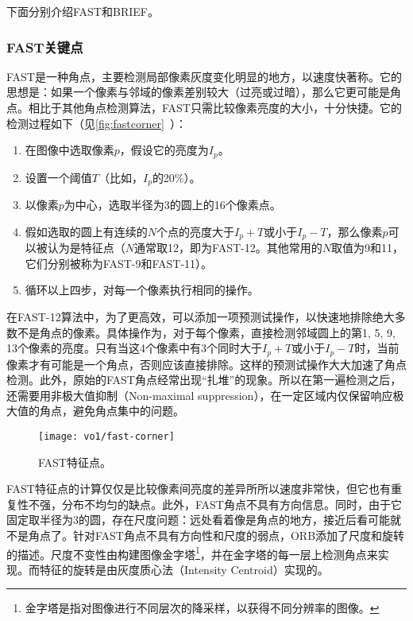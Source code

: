 下面分别介绍FAST和BRIEF。
\subsubsection{FAST关键点}

FAST是一种角点，主要检测局部像素灰度变化明显的地方，以速度快著称。它的思想是：如果一个像素与邻域的像素差别较大（过亮或过暗），那么它更可能是角点。相比于其他角点检测算法，FAST只需比较像素亮度的大小，十分快捷。它的检测过程如下（见\autoref{fig:fastcorner}~）：

\begin{enumerate}
\item 在图像中选取像素$p$，假设它的亮度为$I_{p}$。
\item 设置一个阈值$T$（比如，$I_{p}$的20\%）。
\item 以像素$p$为中心，选取半径为3的圆上的16个像素点。
\item 假如选取的圆上有连续的$N$个点的亮度大于$I_{p}+T$或小于$I_{p}-T$，那么像素$p$可以被认为是特征点（$N$通常取12，即为FAST-12。其他常用的$N$取值为9和11，它们分别被称为FAST-9和FAST-11）。
\item 循环以上四步，对每一个像素执行相同的操作。
\end{enumerate}

在FAST-12算法中，为了更高效，可以添加一项预测试操作，以快速地排除绝大多数不是角点的像素。具体操作为，对于每个像素，直接检测邻域圆上的第1, 5, 9, 13个像素的亮度。只有当这4个像素中有3个同时大于$I_{p}+T$或小于$I_{p}-T$时，当前像素才有可能是一个角点，否则应该直接排除。这样的预测试操作大大加速了角点检测。此外，原始的FAST角点经常出现“扎堆”的现象。所以在第一遍检测之后，还需要用非极大值抑制（Non-maximal suppression），在一定区域内仅保留响应极大值的角点，避免角点集中的问题。

\begin{figure}[!ht]
	\centering
	\texttt{[image: vo1/fast-corner]}
	\caption{FAST特征点\textsuperscript{\cite{Rosten2006}}。}
	\label{fig:fastcorner}
\end{figure}

FAST特征点的计算仅仅是比较像素间亮度的差异所所以速度非常快，但它也有重复性不强，分布不均匀的缺点。此外，FAST角点不具有方向信息。同时，由于它固定取半径为3的圆，存在尺度问题：远处看着像是角点的地方，接近后看可能就不是角点了。针对FAST角点不具有方向性和尺度的弱点，ORB添加了尺度和旋转的描述。尺度不变性由构建图像金字塔\footnote{金字塔是指对图像进行不同层次的降采样，以获得不同分辨率的图像。}，并在金字塔的每一层上检测角点来实现。而特征的旋转是由灰度质心法（Intensity Centroid）实现的。

